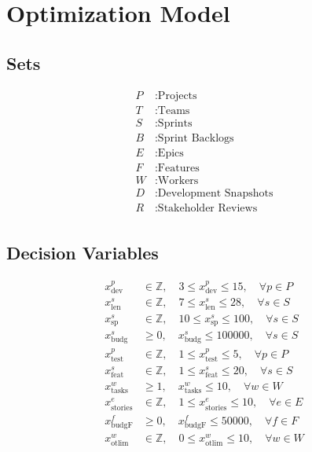 \documentclass{article}
\begin{document}
\section*{Optimization Model}

\subsection*{Sets}
\begin{align*}
P &: \text{Projects}\\
T &: \text{Teams}\\
S &: \text{Sprints}\\
B &: \text{Sprint Backlogs}\\
E &: \text{Epics}\\
F &: \text{Features}\\
W &: \text{Workers}\\
D &: \text{Development Snapshots}\\
R &: \text{Stakeholder Reviews}\\
\end{align*}

\subsection*{Decision Variables}
\begin{align*}
x_{\text{dev}}^{p} &\in \mathbb{Z}, \quad 3 \le x_{\text{dev}}^{p} \le 15, \quad \forall p \in P\\
x_{\text{len}}^{s} &\in \mathbb{Z}, \quad 7 \le x_{\text{len}}^{s} \le 28, \quad \forall s \in S\\
x_{\text{sp}}^{s} &\in \mathbb{Z}, \quad 10 \le x_{\text{sp}}^{s} \le 100, \quad \forall s \in S\\
x_{\text{budg}}^{s} &\ge 0, \quad x_{\text{budg}}^{s} \le 100000, \quad \forall s \in S\\
x_{\text{test}}^{p} &\in \mathbb{Z}, \quad 1 \le x_{\text{test}}^{p} \le 5, \quad \forall p \in P\\
x_{\text{feat}}^{s} &\in \mathbb{Z}, \quad 1 \le x_{\text{feat}}^{s} \le 20, \quad \forall s \in S\\
x_{\text{tasks}}^{w} &\ge 1, \quad x_{\text{tasks}}^{w} \le 10, \quad \forall w \in W\\
x_{\text{stories}}^{e} &\in \mathbb{Z}, \quad 1 \le x_{\text{stories}}^{e} \le 10, \quad \forall e \in E\\
x_{\text{budgF}}^{f} &\ge 0, \quad x_{\text{budgF}}^{f} \le 50000, \quad \forall f \in F\\
x_{\text{otlim}}^{w} &\in \mathbb{Z}, \quad 0 \le x_{\text{otlim}}^{w} \le 10, \quad \forall w \in W
\end{align*}
\end{document}

